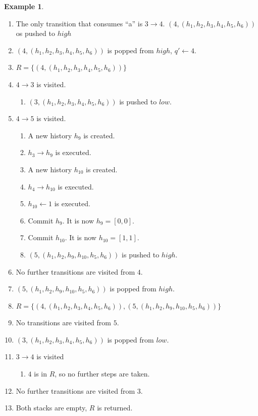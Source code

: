 \documentclass[english]{sigplanconf}
\theoremstyle{definition}
\newtheorem{example}{Example}[section]
\begin{document}
\begin{example}
\begin{enumerate}
\item The only transition that consumes ``a'' is $3\rightarrow 4$. $(4, (h_1, h_2, h_3, h_4, h_5, h_6))$ os pushed to $high$
\item $(4, (h_1, h_2, h_3, h_4, h_5, h_6))$ is popped from $high$, $q'\leftarrow 4$.
\item $R=\{(4, (h_1, h_2, h_3, h_4, h_5, h_6))\}$
\item $4\rightarrow 3$ is visited. \begin{enumerate}
	\item $(3, (h_1, h_2, h_3, h_4, h_5, h_6))$ is pushed to $low$.
\end{enumerate}
\item $4\rightarrow 5$ is visited. \begin{enumerate}
	\item A new history $h_9$ is created.
	\item $h_3\rightarrow h_9$ is executed.
	\item A new history $h_{10}$ is created.
	\item $h_4\rightarrow h_{10}$ is executed.
	\item $h_{10} \leftarrow 1$ is executed.
	\item Commit $h_9$. It is now $h_9=[0,0]$.
	\item Commit $h_{10}$. It is now $h_{10}=[1,1]$.
	\item $(5, (h_1, h_2, h_9, h_{10}, h_5, h_6))$ is pushed to $high$.
\end{enumerate}
\item No further transitions are visited from $4$.
\item $(5, (h_1, h_2, h_9, h_{10}, h_5, h_6))$ is popped from $high$.
\item $R=\{(4, (h_1, h_2, h_3, h_4, h_5, h_6)), (5, (h_1, h_2, h_9, h_{10}, h_5, h_6))\}$
\item No transitions are visited from $5$.
\item $(3, (h_1, h_2, h_3, h_4, h_5, h_6))$ is popped from $low$.
\item $3\rightarrow 4$ is visited \begin{enumerate}
	\item $4$ is in $R$, so no further steps are taken.
\end{enumerate}
\item No further transitions are visited from $3$.
\item Both stacks are empty, $R$ is returned.
\end{enumerate}
\end{example}
\end{document}
